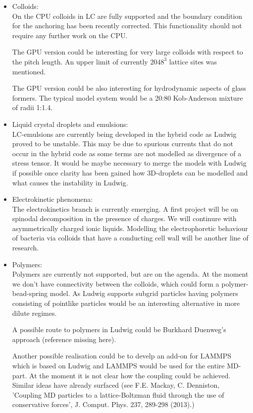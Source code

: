 \documentclass[11pt,twoside]{article}
\begin{document}
\begin{itemize}
\item Colloids:\\
On the CPU colloids in LC are fully supported and the boundary condition for 
the anchoring has been recently corrected. This functionality should 
not require any further work on the CPU.

The GPU version could be interesting for very large colloids with respect to 
the pitch length. An upper limit of currently $2048^3$ lattice sites was mentioned.  

The GPU version could be also interesting for hydrodynamic aspects of 
glass formers. The typical model system would be a 20:80 Kob-Anderson 
mixture of radii 1:1.4.

\item Liquid crystal droplets and emulsions:\\
LC-emulsions are currently being developed in the hybrid code as Ludwig 
proved to be unstable. This may be due to spurious currents that do not
occur in the hybrid code as some terms are not modelled as divergence of a stress tensor.  
It would be maybe necessary to merge the models with Ludwig if possible 
once clarity has been gained how 3D-droplets can be modelled and
what causes the instability in Ludwig.

\item Electrokinetic phenomena:\\
The electrokinetics branch is currently emerging. A first project will be
on spinodal decomposition in the presence of charges. We will continure
with asymmetrically charged ionic liquids. Modelling the electrophoretic
behaviour of bacteria via colloids that have a conducting cell wall will
be another line of research.

\item Polymers:\\
Polymers are currently not supported, but are on the agenda. 
At the moment we don't have connectivity between the colloids,
which could form a polymer-bead-spring model. As Ludwig supports subgrid particles 
having polymers consisting of pointlike particles would be an interesting 
alternative in more dilute regimes.
 
A possible route to polymers in Ludwig could be Burkhard Duenweg's 
approach (reference missing here).

Another possible realisation could be to develp an add-on for 
LAMMPS which is based on Ludwig and LAMMPS would be used for the entire MD-part. 
At the moment it is not clear how the coupling could be achieved. Similar 
ideas have already surfaced (see F.E. Mackay, C. Denniston, 
'Coupling MD particles to a lattice-Boltzman fluid through the use of 
conservative forces', J. Comput. Phys. 237, 289-298 (2013).)  

\end{itemize}
\end{document}
